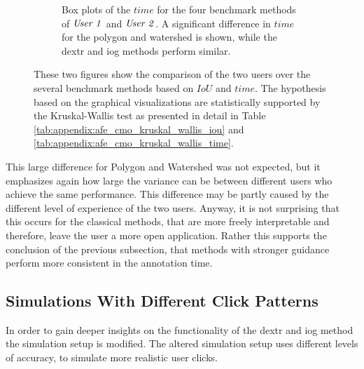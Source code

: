 \begin{figure} [h!]
\begin{subfigure}[t]{0.45\textwidth}
 		\caption{
 			Box plots of the $ time $ for the four benchmark methods of $ \textnormal{\textit{User 1}} $ and $ \textnormal{\textit{User 2}} $.
 			A significant difference in $ time $ for the polygon and watershed is shown, while the \gls{dextr} and \gls{iog} methods perform similar.
 		}\label{fig:ch5:sec3:cmo_afe_time}
 	\end{subfigure}
 	\caption[Box plots of two experienced user on $ IoU $ and $ time$.]{		
 		These two figures show the comparison of the two users over the several benchmark methods based on $ IoU $ and $ time $.
 		The hypothesis based on the graphical visualizations are statistically supported by the Kruskal-Wallis test as presented in detail in Table \ref{tab:appendix:afe_cmo_kruskal_wallis_iou} and \ref{tab:appendix:afe_cmo_kruskal_wallis_time}.
 	}\label{fig:ch5:sec3:cmo_afe}
\end{figure}

This large difference for Polygon and Watershed was not expected, but it emphasizes again how large the variance can be between different users who achieve the same performance.
This difference may be partly caused by the different level of experience of the two users.
Anyway, it is not surprising that this occurs for the classical methods, that are more freely interpretable and therefore, leave the user a more open application.
Rather this supports the conclusion of the previous subsection, that methods with stronger guidance perform more consistent in the annotation time.


\subsection{Simulations With Different Click Patterns}\label{ord:ch5:sec3:subsec3}



In order to gain deeper insights on the functionality of the \gls{dextr} and \gls{iog} method the simulation setup is modified.
The altered simulation setup uses different levels of accuracy, to simulate more realistic user clicks.

